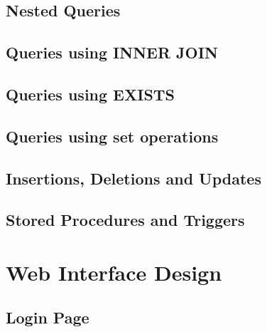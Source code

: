 \subsection{Nested Queries}

\subsection{Queries using INNER JOIN}

\subsection{Queries using EXISTS}

\subsection{Queries using set operations}

\subsection{Insertions, Deletions and Updates}

\subsection{Stored Procedures and Triggers}

\newpage

\section{Web Interface Design}

\subsection{Login Page}

\newpage

